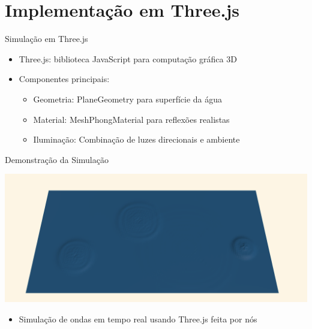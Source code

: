 \documentclass[aspectratio=169,xcolor=table]{beamer}
\begin{document}
\section{Implementação em Three.js}
\begin{frame}{Simulação em Three.js}
    \begin{itemize}
        \item Three.js: biblioteca JavaScript para computação gráfica 3D \cite{threejs2024}
        \item Componentes principais:
        \begin{itemize}
            \item Geometria: PlaneGeometry para superfície da água
            \item Material: MeshPhongMaterial para reflexões realistas
            \item Iluminação: Combinação de luzes direcionais e ambiente
        \end{itemize}
    \end{itemize}
\end{frame}

\begin{frame}{Demonstração da Simulação}
    \begin{center}
        \includegraphics[height=0.35\textheight]{imgs/wave.png}
    \end{center}
    
    \begin{itemize}
        \item Simulação de ondas em tempo real usando Three.js feita por nós
    \end{itemize}
\end{frame}
\end{document}
